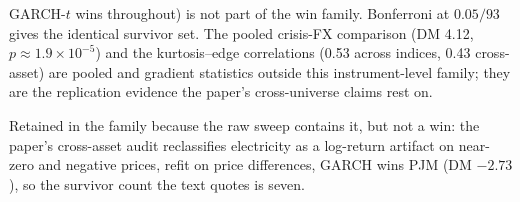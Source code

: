 \documentclass[11pt]{article}
\begin{document}
\begin{table}[htbp]
\begin{threeparttable}
\begin{tablenotes}
GARCH-$t$ wins throughout) is not part of the win family. Bonferroni
at $0.05/93$ gives the identical survivor set. The pooled crisis-FX
comparison (DM 4.12, $p\approx1.9\times10^{-5}$) and the
kurtosis--edge correlations (0.53 across indices, 0.43 cross-asset)
are pooled and gradient statistics outside this instrument-level
family; they are the replication evidence the paper's cross-universe
claims rest on.
\item[a] Retained in the family because the raw sweep contains it,
but not a win: the paper's cross-asset audit reclassifies electricity
as a log-return artifact on near-zero and negative prices, refit on price differences, GARCH wins PJM (DM $-2.73$), so the survivor count the text quotes is seven.
\end{tablenotes}
\end{threeparttable}
\end{table}
\end{document}
